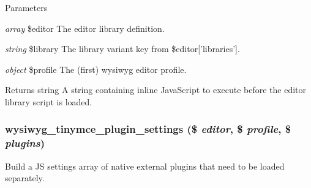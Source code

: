 \begin{DoxyParams}{Parameters}
\item[{\em array}]\$editor The editor library definition. \item[{\em string}]\$library The library variant key from \$editor\mbox{[}'libraries'\mbox{]}. \item[{\em object}]\$profile The (first) wysiwyg editor profile.\end{DoxyParams}
\begin{DoxyReturn}{Returns}
string A string containing inline JavaScript to execute before the editor library script is loaded. 
\end{DoxyReturn}
\hypertarget{tinymce_8inc_ace36464c11cfbdbf7bc5eb6fc094d7a3}{
\subsubsection[{wysiwyg\_\-tinymce\_\-plugin\_\-settings}]{\setlength{\rightskip}{0pt plus 5cm}wysiwyg\_\-tinymce\_\-plugin\_\-settings (\$ {\em editor}, \/  \$ {\em profile}, \/  \$ {\em plugins})}}
\label{tinymce_8inc_ace36464c11cfbdbf7bc5eb6fc094d7a3}
Build a JS settings array of native external plugins that need to be loaded separately.

